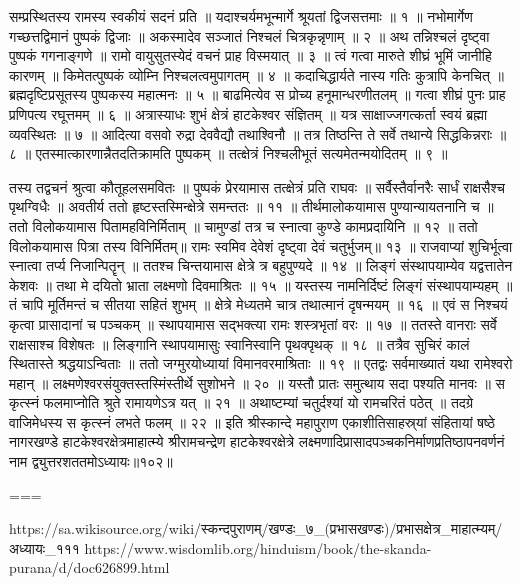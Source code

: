 
सम्प्रस्थितस्य रामस्य स्वकीयं सदनं प्रति ॥
यदाश्चर्यमभून्मार्गे श्रूयतां द्विजसत्तमाः ॥ १ ॥
नभोमार्गेण गच्छत्तद्विमानं पुष्पकं द्विजाः ॥
अकस्मादेव सञ्जातं निश्चलं चित्रकृन्नृणाम् ॥ २ ॥
अथ तन्निश्चलं दृष्ट्वा पुष्पकं गगनाङ्गणे ॥
रामो वायुसुतस्येदं वचनं प्राह विस्मयात् ॥ ३ ॥
त्वं गत्वा मारुते शीघ्रं भूमिं जानीहि कारणम् ॥
किमेतत्पुष्पकं व्योम्नि निश्चलत्वमुपागतम् ॥ ४ ॥
कदाचिद्धार्यते नास्य गतिः कुत्रापि केनचित् ॥
ब्रह्मदृष्टिप्रसूतस्य पुष्पकस्य महात्मनः ॥ ५ ॥
बाढमित्येव स प्रोच्य हनूमान्धरणीतलम् ॥
गत्वा शीघ्रं पुनः प्राह प्रणिपत्य रघूत्तमम् ॥ ६ ॥
अत्रास्याधः शुभं क्षेत्रं हाटकेश्वर संज्ञितम् ॥
यत्र साक्षाज्जगत्कर्ता स्वयं ब्रह्मा व्यवस्थितः ॥ ७ ॥
आदित्या वसवो रुद्रा देववैद्यौ तथाश्विनौ ॥
तत्र तिष्ठन्ति ते सर्वे तथान्ये सिद्धकिन्नराः ॥ ८ ॥
एतस्मात्कारणान्नैतदतिक्रामति पुष्पकम् ॥
तत्क्षेत्रं निश्चलीभूतं सत्यमेतन्मयोदितम् ॥ ९ ॥

तस्य तद्वचनं श्रुत्वा कौतूहलसमवितः ॥
पुष्पकं प्रेरयामास तत्क्षेत्रं प्रति राघवः ॥
सर्वैस्तैर्वानरैः सार्धं राक्षसैश्च पृथग्विधैः ॥
अवतीर्य ततो हृष्टस्तस्मिन्क्षेत्रे समन्ततः ॥ ११ ॥
तीर्थमालोकयामास पुण्यान्यायतनानि च ॥
ततो विलोकयामास पितामहविनिर्मिताम् ॥
चामुण्डां तत्र च स्नात्वा कुण्डे कामप्रदायिनि ॥ १२ ॥
ततो विलोकयामास पित्रा तस्य विनिर्मितम्॥
रामः स्वमिव देवेशं दृष्ट्वा देवं चतुर्भुजम्॥ १३ ॥
राजवाप्यां शुचिर्भूत्वा स्नात्वा तर्प्य निजान्पितॄन् ॥
ततश्च चिन्तयामास क्षेत्रे त्र बहुपुण्यदे ॥ १४ ॥
लिङ्गं संस्थापयाम्येव यद्वत्तातेन केशवः ॥
तथा मे दयितो भ्राता लक्ष्मणो दिवमाश्रितः ॥ १५ ॥
यस्तस्य नामनिर्दिष्टं लिङ्गं संस्थापयाम्यहम् ॥
तं चापि मूर्तिमन्तं च सीतया सहितं शुभम् ॥
क्षेत्रे मेध्यतमे चात्र तथात्मानं दृषन्मयम् ॥ १६ ॥
एवं स निश्चयं कृत्वा प्रासादानां च पञ्चकम् ॥
स्थापयामास सद्भक्त्या रामः शस्त्रभृतां वरः ॥ १७ ॥
ततस्ते वानराः सर्वे राक्षसाश्च विशेषतः ॥
लिङ्गानि स्थापयामासुः स्वानिस्वानि पृथक्पृथक् ॥ १८ ॥
तत्रैव सुचिरं कालं स्थितास्ते श्रद्धयाऽन्विताः ॥
ततो जग्मुरयोध्यायां विमानवरमाश्रिताः ॥ १९ ॥
एतद्वः सर्वमाख्यातं यथा रामेश्वरो महान् ॥
लक्ष्मणेश्वरसंयुक्तस्तस्मिंस्तीर्थे सुशोभने ॥ २० ॥
यस्तौ प्रातः समुत्थाय सदा पश्यति मानवः ॥
स कृत्स्नं फलमाप्नोति श्रुते रामायणेऽत्र यत् ॥ २१ ॥
अथाष्टम्यां चतुर्दश्यां यो रामचरितं पठेत् ॥
तदग्रे वाजिमेधस्य स कृत्स्नं लभते फलम् ॥ २२ ॥
इति श्रीस्कान्दे महापुराण एकाशीतिसाहस्र्यां संहितायां षष्ठे नागरखण्डे हाटकेश्वरक्षेत्रमाहात्म्ये श्रीरामचन्द्रेण हाटकेश्वरक्षेत्रे लक्ष्मणादिप्रासादपञ्चकनिर्माणप्रतिष्ठापनवर्णनं नाम द्व्युत्तरशततमोऽध्यायः॥१०२॥

===

https://sa.wikisource.org/wiki/स्कन्दपुराणम्/खण्डः_७_(प्रभासखण्डः)/प्रभासक्षेत्र_माहात्म्यम्/अध्यायः_१११
https://www.wisdomlib.org/hinduism/book/the-skanda-purana/d/doc626899.html

